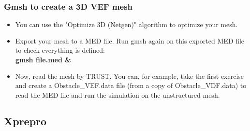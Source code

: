 \documentclass[10pt]{beamer}
\begin{document}
\begin{frame}
\frametitle{Gmsh to create a 3D VEF mesh}
\begin{block}{}

\begin{itemize}
\item You can use the "Optimize 3D (Netgen)" algorithm to optimize your mesh.

\item Export your mesh to a MED file. Run gmsh again on this exported MED file to check everything is defined:\\
\textbf{gmsh file.med \&}

\item Now, read the mesh by TRUST. You can, for example, take the first exercise and create a Obstacle\_VEF.data file (from a copy of Obstacle\_VDF.data) to read the MED file and run the simulation on the unstructured mesh.
\end{itemize}

\end{block}
\end{frame}


\subsection{Xprepro}
\end{document}
